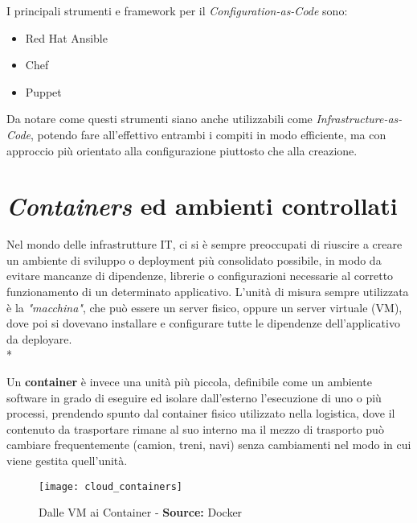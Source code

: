 \documentclass[../main.tex]{subfiles}
\begin{document}
            I principali strumenti e framework per il \emph{Configuration-as-Code} sono:
            \begin{itemize}
                \item Red Hat Ansible
                \item Chef
                \item Puppet
            \end{itemize}
            
            Da notare come questi strumenti siano anche utilizzabili come \emph{Infrastructure-as-Code}, potendo fare all'effettivo entrambi i compiti in modo efficiente, ma con approccio più orientato alla configurazione piuttosto che alla creazione.
    
        \section{\emph{Containers} ed ambienti controllati}
        \label{sec:cloud_containers}
    
            Nel mondo delle infrastrutture IT, ci si è sempre preoccupati di riuscire a creare un ambiente di sviluppo o deployment più consolidato possibile, in modo da evitare mancanze di dipendenze, librerie o configurazioni necessarie al corretto funzionamento di un determinato applicativo. L'unità di misura sempre utilizzata è la \emph{"macchina"}, che può essere un server fisico, oppure un server virtuale (VM), dove poi si dovevano installare e configurare tutte le dipendenze dell'applicativo da deployare.\\*
            
            Un \textbf{container}\cite{cloud_container} è invece una unità più piccola, definibile come un ambiente software in grado di eseguire ed isolare dall'esterno l'esecuzione di uno o più processi, prendendo spunto dal container fisico utilizzato nella logistica, dove il contenuto da trasportare rimane al suo interno ma il mezzo di trasporto può cambiare frequentemente (camion, treni, navi) senza cambiamenti nel modo in cui viene gestita quell'unità.
            
            \begin{figure}[h]
    			\centering
    			\texttt{[image: cloud\_containers]}
    			\caption{Dalle VM ai Container - \textbf{Source:} Docker}
    			\label{fig:cloud_containers}
    	    \end{figure}
            
\end{document}
